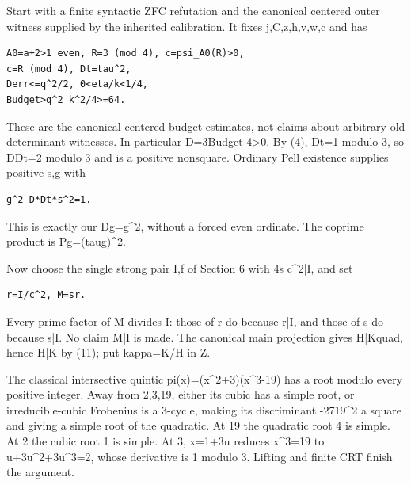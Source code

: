 Start with a finite syntactic ZFC refutation and the canonical centered outer witness supplied by the inherited calibration. It fixes j,C,z,h,v,w,c and has



\begin{verbatim}
A0=a+2>1 even, R=3 (mod 4), c=psi_A0(R)>0,
c=R (mod 4), Dt=tau^2,
Derr<=q^2/2, 0<eta/k<1/4,
Budget>q^2 k^2/4>=64.
\end{verbatim}

These are the canonical centered-budget estimates, not claims about arbitrary old determinant witnesses. In particular D=\allowbreak{}3Budget-4\textgreater{}\allowbreak{}0. By (4), Dt=\allowbreak{}1 modulo 3, so D\textasteriskcentered{}\allowbreak{}Dt=\allowbreak{}2 modulo 3 and is a positive nonsquare. Ordinary Pell existence supplies positive s,g with



\begin{verbatim}
g^2-D*Dt*s^2=1.
\end{verbatim}

This is exactly our Dg=\allowbreak{}g\textasciicircum{}\allowbreak{}2, without a forced even ordinate. The coprime product is Pg=\allowbreak{}(tau\textasteriskcentered{}\allowbreak{}g)\textasciicircum{}\allowbreak{}2.



Now choose the single strong pair I,f of Section 6 with 4s c\textasciicircum{}\allowbreak{}2|I, and set



\begin{verbatim}
r=I/c^2, M=sr.
\end{verbatim}

Every prime factor of M divides I: those of r do because r|I, and those of s do because s|I. No claim M|I is made. The canonical main projection gives H|Kquad, hence H|K by (11); put kappa=\allowbreak{}K/\allowbreak{}H in Z.



The classical intersective quintic pi(x)=\allowbreak{}(x\textasciicircum{}\allowbreak{}2+\allowbreak{}3)(x\textasciicircum{}\allowbreak{}3-19) has a root modulo every positive integer. Away from 2,3,19, either its cubic has a simple root, or irreducible-cubic Frobenius is a 3-cycle, making its discriminant -27\textasteriskcentered{}\allowbreak{}19\textasciicircum{}\allowbreak{}2 a square and giving a simple root of the quadratic. At 19 the quadratic root 4 is simple. At 2 the cubic root 1 is simple. At 3, x=\allowbreak{}1+\allowbreak{}3u reduces x\textasciicircum{}\allowbreak{}3=\allowbreak{}19 to u+\allowbreak{}3u\textasciicircum{}\allowbreak{}2+\allowbreak{}3u\textasciicircum{}\allowbreak{}3=\allowbreak{}2, whose derivative is 1 modulo 3. Lifting and finite CRT finish the argument.



